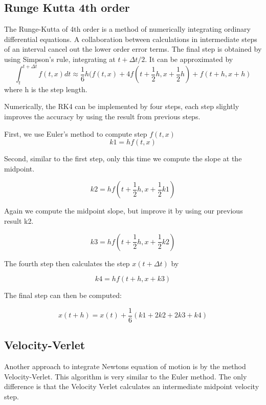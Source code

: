 \documentclass{aa}   %
\begin{document}
\subsection{Runge Kutta 4th order}
The Runge-Kutta of 4th order is a method of numerically integrating ordinary differential equations. A collaboration between calculations in intermediate steps of an interval cancel out the lower order error terms. The final step is obtained by using Simpson's rule, integrating at $t+\Delta t/2$. It can be approximated by
\begin{equation}
\int_t^{t+\Delta t} f(t,x) dt \approx \frac{1}{6}h(f(t,x) + 4f(t+ \frac{1}{2}h, x+ \frac{1}{2}h) + f(t + h, x + h)
\end{equation}
where h is the step length. 

Numerically, the RK4 can be implemented by four steps, each step slightly improves the accuracy by using the result from previous steps.

First, we use Euler's method to compute step $f(t,x)$ 
\begin{equation}
k1 = hf(t, x)
\end{equation}

Second, similar to the first step, only this time we compute the slope at the midpoint.

\begin{equation}
k2 = hf(t + \frac{1}{2}h, x + \frac{1}{2} k1)
\end{equation}

Again we compute the midpoint slope, but improve it by using our previous result k2.

\begin{equation}
k3 = hf(t + \frac{1}{2} h, x + \frac{1}{2} k2)
\end{equation}

The fourth step then calculates the step $x(t+\Delta t)$ by

\begin{equation}
k4 = hf(t + h, x +k3)
\end{equation}

The final step can then be computed:

\begin{equation}
x(t + h) = x(t) + \frac{1}{6}(k1 + 2k2 + 2k3 + k4)
\end{equation}

\subsection{Velocity-Verlet}
Another approach to integrate Newtons equation of motion is by the method Velocity-Verlet. This algorithm is very similar to the Euler method. The only difference is that the Velocity Verlet calculates an intermediate midpoint velocity step. 
\end{document}
